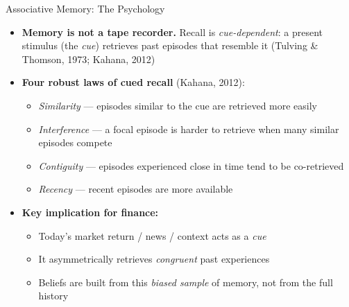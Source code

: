 \documentclass[aspectratio=169, 11pt]{beamer}
\begin{document}
\begin{frame}{Associative Memory: The Psychology}
\begin{itemize}
\item \textbf{Memory is not a tape recorder.} Recall is \emph{cue-dependent}: a present stimulus (the \emph{cue}) retrieves past episodes that resemble it (Tulving \& Thomson, 1973; Kahana, 2012)
\item \textbf{Four robust laws of cued recall} (Kahana, 2012):
  \begin{itemize}
  \item \emph{Similarity} --- episodes similar to the cue are retrieved more easily
  \item \emph{Interference} --- a focal episode is harder to retrieve when many similar episodes compete
  \item \emph{Contiguity} --- episodes experienced close in time tend to be co-retrieved
  \item \emph{Recency} --- recent episodes are more available
  \end{itemize}
\item \textbf{Key implication for finance:}
  \begin{itemize}
  \item Today's market return / news / context acts as a \emph{cue}
  \item It asymmetrically retrieves \emph{congruent} past experiences
  \item Beliefs are built from this \emph{biased sample} of memory, not from the full history
  \end{itemize}
\end{itemize}
\end{frame}
\end{document}
